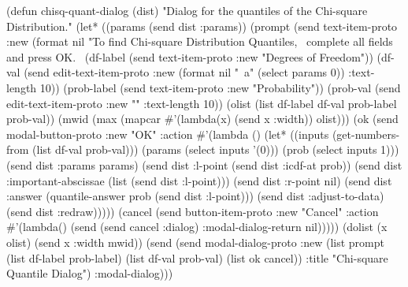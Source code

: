 \nwenddocs{}\endmoddef
(defun chisq-quant-dialog (dist)
  "Dialog for the quantiles of the Chi-square Distribution."
  (let* ((params (send dist :params))
         (prompt (send text-item-proto :new
                  (format nil 
                    "To find Chi-square Distribution Quantiles,~%
                     complete all fields and press OK.~%
         (df-label (send text-item-proto :new "Degrees of Freedom"))
         (df-val (send edit-text-item-proto :new
                       (format nil "~a" (select params 0)) :text-length 10))
         (prob-label (send text-item-proto :new "Probability"))
         (prob-val (send edit-text-item-proto :new "" :text-length 10))
         (olist (list df-label df-val prob-label prob-val))
         (mwid (max (mapcar #'(lambda(x) (send x :width)) olist)))
         (ok (send modal-button-proto :new "OK"
                   :action
                   #'(lambda ()
                      (let* ((inputs (get-numbers-from 
                                      (list df-val prob-val)))
                             (params (select inputs '(0)))
                             (prob (select inputs 1)))
                         (send dist :params params)
                         (send dist :l-point (send dist :icdf-at prob))
                         (send dist :important-abscissae 
                               (list (send dist :l-point)))
                         (send dist :r-point nil)
                         (send dist :answer
                              (quantile-answer prob (send dist :l-point)))
                         (send dist :adjust-to-data)
                         (send dist :redraw)))))
         (cancel (send button-item-proto :new "Cancel"
                       :action
                       #'(lambda()
                           (send (send cancel :dialog)
                                 :modal-dialog-return nil)))))
    (dolist (x olist)
            (send x :width mwid))
    (send (send modal-dialog-proto
                :new (list prompt
                           (list df-label prob-label)
                           (list df-val prob-val)
                           (list ok cancel))
                :title "Chi-square Quantile Dialog") :modal-dialog)))
\eatline
